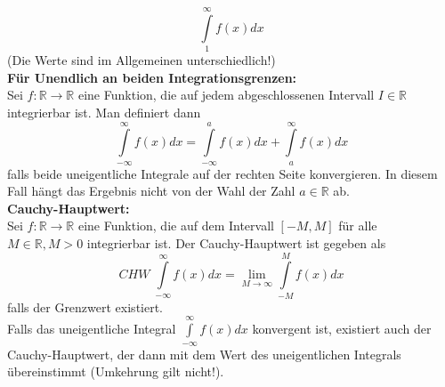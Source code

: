 \documentclass[a4paper,twocolumn,10pt]{article}
\begin{document}
\begin{equation*}
\int\limits_{1}^{\infty}f(x)dx
\end{equation*}
(Die Werte sind im Allgemeinen unterschiedlich!)\\
\textbf{Für Unendlich an beiden Integrationsgrenzen:}\\
Sei $f:\mathbb{R}\rightarrow\mathbb{R}$ eine Funktion, die auf jedem abgeschlossenen Intervall $I\in \mathbb{R}$ integrierbar ist. Man definiert dann
\begin{equation*}
\int\limits_{-\infty}^{\infty}f(x)dx=\int\limits_{-\infty}^{a}f(x)dx+\int\limits_{a}^{\infty}f(x)dx
\end{equation*}
falls beide uneigentliche Integrale auf der rechten Seite konvergieren. In diesem Fall hängt das Ergebnis nicht von der Wahl der Zahl $a\in \mathbb{R}$ ab.\\
\textbf{Cauchy-Hauptwert:}\\
Sei $f:\mathbb{R}\rightarrow\mathbb{R}$ eine Funktion, die auf dem Intervall $[-M,M]$ für alle $M\in\mathbb{R},M>0$ integrierbar ist. Der Cauchy-Hauptwert ist gegeben als
\begin{equation*}
CHW\;\int\limits_{-\infty}^{\infty}f(x)dx=\lim\limits_{M\rightarrow\infty}\int\limits_{-M}^{M}f(x)dx
\end{equation*}
falls der Grenzwert existiert.\\
Falls das uneigentliche Integral $\int\limits_{-\infty}^{\infty}f(x)dx$ konvergent ist, existiert auch der Cauchy-Hauptwert, der dann mit dem Wert des uneigentlichen Integrals übereinstimmt (Umkehrung gilt nicht!).
\end{document}
